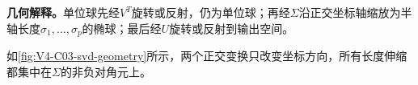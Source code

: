 \documentclass[UTF8,a4paper,11pt,openany]{ctexbook}
\begin{document}
\setcounter{page}{595}
\setcounter{chapter}{26}
\setcounter{figure}{0}
\pagestyle{headings}
\begin{geometrybox}
\textbf{几何解释。}单位球先经$V^T$旋转或反射，仍为单位球；再经$\Sigma$沿正交坐标轴缩放为半轴长度$\sigma_1,\ldots,\sigma_p$的椭球；最后经$U$旋转或反射到输出空间。
\end{geometrybox}
如\cref{fig:V4-C03-svd-geometry}所示，两个正交变换只改变坐标方向，所有长度伸缩都集中在$\Sigma$的非负对角元上。

\end{document}
